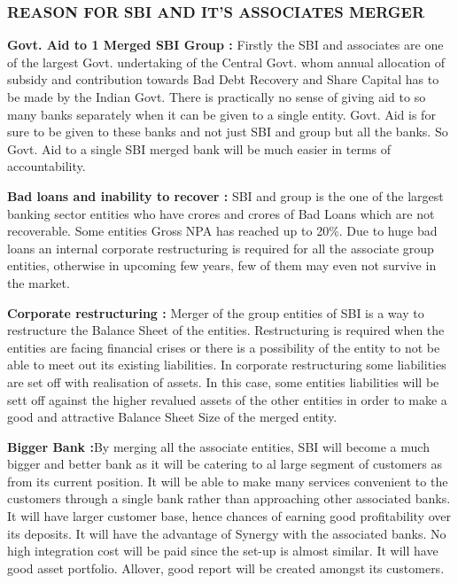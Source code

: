 \documentclass[a4paper, 12pt]{extarticle}
\begin{document}
{\subsubsection {REASON FOR SBI AND IT'S ASSOCIATES MERGER}
\par \textbf{Govt. Aid to 1 Merged SBI Group :} Firstly the SBI and associates are one of the largest Govt. undertaking of the Central Govt. whom annual allocation of subsidy and contribution towards Bad Debt Recovery and Share Capital has to be made by the Indian Govt. There is practically no sense of giving aid to so many banks separately when it can be given to a single entity. Govt. Aid is for sure to be given to these banks and not just SBI and group but all the banks. So Govt. Aid to a single SBI merged bank will be much easier in terms of accountability.
\par \textbf{Bad loans and inability to recover :} SBI and group is the one of the largest banking sector entities who have crores and crores of Bad Loans which are not recoverable. Some entities Gross NPA has reached up to 20\%. Due to huge bad loans an internal corporate restructuring is required for all the associate group entities, otherwise in upcoming few years, few of them may even not survive in the market.
\par \textbf{Corporate restructuring :} Merger of the group entities of SBI is a way to restructure the Balance Sheet of the entities. Restructuring is required when the entities are facing financial crises or there is a possibility of the entity to not be able to meet out its existing liabilities. In corporate restructuring some liabilities are set off with realisation of assets. In this case, some entities liabilities will be sett off against the higher revalued assets of the other entities in order to make a good and attractive Balance Sheet Size of the merged entity.
\par \textbf{Bigger Bank :}By merging all the associate entities, SBI will become a much bigger and better bank as it will be catering to al large segment of customers as from its current position. It will be able to make many services convenient to the customers through a single bank rather than approaching other associated banks. It will have larger customer base, hence chances of earning good profitability over its deposits. It will have the advantage of Synergy with the associated banks. No high integration cost will be paid since the set-up is almost similar. It will have good asset portfolio. Allover, good report will be created amongst its customers.
}
\end{document}

